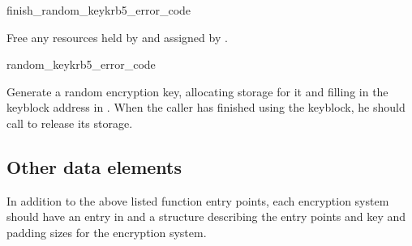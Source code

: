 \begin{funcdecl}{finish_random_key}{krb5_error_code}{\funcvoid}
\end{funcdecl}
Free any resources held by  and assigned by
. 

\begin{funcdecl}{random_key}{krb5_error_code}{\funcvoid}
\end{funcdecl}
Generate a random encryption key, allocating storage for it and
filling in the keyblock address in .
When the caller has finished using the keyblock, he should call
 to release its storage.

\subsection{Other data elements}
In addition to the above listed function entry points, each encryption
system should have an entry in  and a
 structure describing the entry points
and key and padding sizes for the encryption system.
